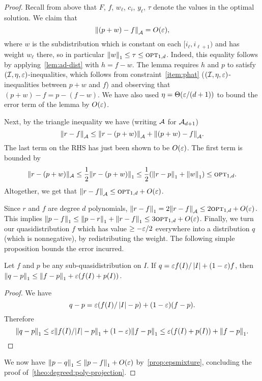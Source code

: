 \begin{proof}
Recall from above that $F$, $f$, $w_\ell$, $c_i$, $y_\ell$, $\tau$
denote the values in the optimal solution.
We claim that 
\begin{equation}
\label{eq:good}
 \lVert (p+ w) - f {\rVert}_{\cal A} = O(\varepsilon) ,
\end{equation}
where $w$ is the subdistribution 
which is constant on each $[i_\ell, i_{\ell+1})$
and has weight $w_\ell$ there, so in particular ${\lVert w{\rVert}}_1 \leq \tau \leq {\textsc{opt}}_{1,d}$. Indeed, this equality follows by applying~\cref{lem:ad-dist} with ${h
= f-w}$.
{The lemma requires $h$ and $p$ to satisfy $(\mathcal{I}, \eta,
\varepsilon)$-inequalities, which follows from constraint~\ref{item:phat} ($(\mathcal{I}, \eta,
\varepsilon)$-inequalities between $p+w$ and $f$) and observing that
$(p+ w) - f = p- (f - w)$.
We have also used $\eta = \Theta(\varepsilon/{(d+1)})$ 
to bound the {\rm error} term of the lemma by $O(\varepsilon)$.}

Next, by the triangle inequality we have
{(writing ${\cal A}$ for ${\cal A}_{d+1}$)}
\[
\lVert r - f {\rVert}_{\cal A} \leq \lVert r - (p+w) {\rVert}_{\cal A} 
+ \lVert (p+w) - f {\rVert}_{\cal A}.
\]
The last term on the RHS has just been shown to be $O(\varepsilon)$.
The first term is bounded by
\[ \| r-(p+w)\|_{\cal A} \leq \frac{1}{2}{\lVert r-(p+w) {\rVert}}_1 
\leq \frac{1}{2}({\lVert r-p{\rVert}}_1 + {\lVert w{\rVert}}_1) \leq {\textsc{opt}}_{1,d}. \]
Altogether, we get that $\lVert r - f {\rVert}_{\cal A} \leq {\textsc{opt}}_{1,d}+ O(\varepsilon)$.

Since $r$ and $f$ are degree $d$ polynomials, ${\lVert r - f {\rVert}}_1 = 2\lVert r - f {\rVert}_{\cal A} \leq 2{\textsc{opt}}_{1,d}+ O(\varepsilon)$.
This implies ${\lVert p - f {\rVert}}_1 \leq {\lVert p-r{\rVert}}_1 + {\lVert r - f {\rVert}}_1 \leq 3{\textsc{opt}}_{1,d} +  O(\varepsilon)$.
{Finally, we turn our quasidistribution $f$ which has value $\geq -\varepsilon/2$
everywhere into a distribution $q$ (which is nonnegative), by redistributing
the weight.}
The following simple proposition {bounds the error incurred}.

\begin{proposition} \label{prop:epsmixture}
{Let $f$ and $p$ be any sub-quasidistribution on $I$.}
If $q = {\varepsilon f(I)/\left\lvert I \right\rvert + (1- \varepsilon)f}$, then $\lVert q - p{\rVert}_1 \leq \lVert f
- p{\rVert}_1 + {\varepsilon(f(I)+p(I))}$.
\end{proposition}

\begin{proof}
  We have
  \[ q - p = {\varepsilon(f(I)/\left\lvert I \right\rvert - p) + (1-\varepsilon)(f - p)}. \]
  Therefore
  \[ \normone{ q - p } \leq { \eps \norm{f(I)/|I| - p}_1 + (1-\eps) \norm{ f
    - p }_1 \leq \eps(f(I)+p(I)) + \norm{ f - p }_1 } .
\qedhere \]
\end{proof}

We now have ${\lVert p - q {\rVert}}_1 \leq {\lVert p-f {\rVert}}_1 + O(\varepsilon)$ by~\cref{prop:epsmixture},
concluding the proof of~\cref{theo:degreed:poly-projection}.
\end{proof}


